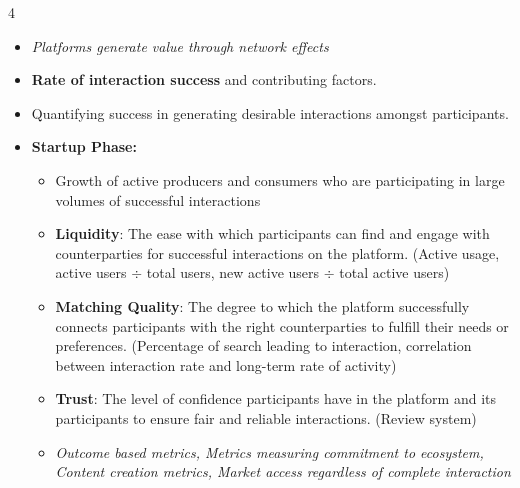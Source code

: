 \documentclass[10pt, landscape]{article}
\begin{document}
\begin{multicols*}{4}
\begin{itemize}
      \item \textit{Platforms generate value through network effects}
      \item \textbf{Rate of interaction success} and contributing factors.
      \item Quantifying success in generating desirable interactions amongst participants.
      \item \textbf{Startup Phase:}
      \begin{itemize}
        \item Growth of active producers and consumers who are participating in large volumes of successful interactions
        \item \textbf{Liquidity}: The ease with which participants can find and engage with counterparties for successful interactions on the platform. (Active usage, active users $\div$ total users, new active users $\div$ total active users)
        \item \textbf{Matching Quality}: The degree to which the platform successfully connects participants with the right counterparties to fulfill their needs or preferences. (Percentage of search leading to interaction, correlation between interaction rate and long-term rate of activity)
        \item \textbf{Trust}: The level of confidence participants have in the platform and its participants to ensure fair and reliable interactions. (Review system)
        \item \textit{Outcome based metrics, Metrics measuring commitment to ecosystem, Content creation metrics, Market access regardless of complete interaction}
      \end{itemize}


\end{itemize}
\end{multicols*}
\end{document}
